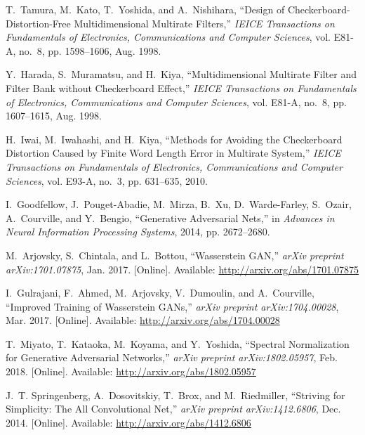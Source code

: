 \documentclass{article}
\begin{document}
\begin{thebibliography}{10}
T.~Tamura, M.~Kato, T.~Yoshida, and A.~Nishihara, ``{Design of
  Checkerboard-Distortion-Free Multidimensional Multirate Filters},''
  \emph{IEICE Transactions on Fundamentals of Electronics, Communications and
  Computer Sciences}, vol. E81-A, no.~8, pp. 1598--1606, Aug. 1998.

Y.~Harada, S.~Muramatsu, and H.~Kiya, ``{Multidimensional Multirate Filter and
  Filter Bank without Checkerboard Effect},'' \emph{IEICE Transactions on
  Fundamentals of Electronics, Communications and Computer Sciences}, vol.
  E81-A, no.~8, pp. 1607--1615, Aug. 1998.

\BIBentryALTinterwordspacing
H.~Iwai, M.~Iwahashi, and H.~Kiya, ``{Methods for Avoiding the Checkerboard
  Distortion Caused by Finite Word Length Error in Multirate System},''
  \emph{IEICE Transactions on Fundamentals of Electronics, Communications and
  Computer Sciences}, vol. E93-A, no.~3, pp. 631--635, 2010.
\BIBentrySTDinterwordspacing

\BIBentryALTinterwordspacing
I.~Goodfellow, J.~Pouget-Abadie, M.~Mirza, B.~Xu, D.~Warde-Farley, S.~Ozair,
  A.~Courville, and Y.~Bengio, ``{Generative Adversarial Nets},'' in
  \emph{Advances in Neural Information Processing Systems},
  2014, pp. 2672--2680.
\BIBentrySTDinterwordspacing

\BIBentryALTinterwordspacing
M.~Arjovsky, S.~Chintala, and L.~Bottou, ``{Wasserstein GAN},'' \emph{arXiv
  preprint arXiv:1701.07875}, Jan. 2017. [Online]. Available:
  \url{http://arxiv.org/abs/1701.07875}
\BIBentrySTDinterwordspacing

\BIBentryALTinterwordspacing
I.~Gulrajani, F.~Ahmed, M.~Arjovsky, V.~Dumoulin, and A.~Courville, ``{Improved
  Training of Wasserstein GANs},'' \emph{arXiv preprint arXiv:1704.00028}, Mar.
  2017. [Online]. Available: \url{http://arxiv.org/abs/1704.00028}
\BIBentrySTDinterwordspacing

\BIBentryALTinterwordspacing
T.~Miyato, T.~Kataoka, M.~Koyama, and Y.~Yoshida, ``{Spectral Normalization for
  Generative Adversarial Networks},'' \emph{arXiv preprint arXiv:1802.05957},
  Feb. 2018. [Online]. Available: \url{http://arxiv.org/abs/1802.05957}
\BIBentrySTDinterwordspacing

\BIBentryALTinterwordspacing
J.~T. Springenberg, A.~Dosovitskiy, T.~Brox, and M.~Riedmiller, ``{Striving for
  Simplicity: The All Convolutional Net},'' \emph{arXiv preprint
  arXiv:1412.6806}, Dec. 2014. [Online]. Available:
  \url{http://arxiv.org/abs/1412.6806}
\BIBentrySTDinterwordspacing


\end{thebibliography}
\end{document}

